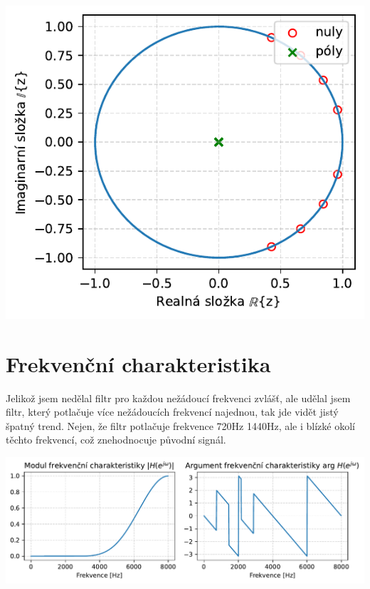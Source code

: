 \documentclass[a4paper, 11pt]{article}
\begin{document}
\begin{center}
        \includegraphics[scale=1]{img/9_np.pdf} \\
\end{center}





\section{Frekvenční charakteristika}
Jelikož jsem nedělal filtr pro každou nežádoucí frekvenci zvlášť, ale udělal jsem filtr, který potlačuje více nežádoucích frekvencí najednou, tak jde vidět jistý špatný trend. Nejen, že filtr potlačuje frekvence 720Hz 1440Hz, ale i blízké okolí těchto frekvencí, což znehodnocuje původní signál. \\
\begin{center}
        \includegraphics[scale=0.85]{img/6_freq_char.pdf} \\
\end{center}
\end{document}
